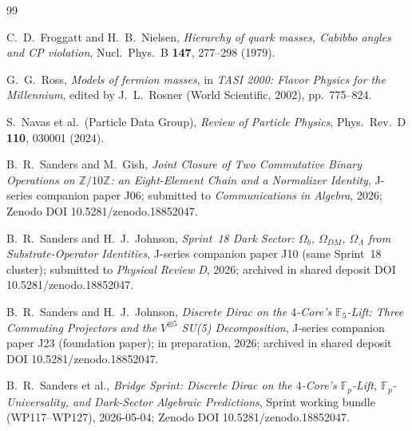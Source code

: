 \documentclass[11pt,reqno]{amsart}
\theoremstyle{plain}
\theoremstyle{definition}
\theoremstyle{remark}
\newcommand{\F}{\mathbb{F}}
\begin{document}
\begin{thebibliography}{99}

C.~D.~Froggatt and H.~B.~Nielsen,
\emph{Hierarchy of quark masses, Cabibbo angles and CP
violation},
Nucl.\ Phys.\ B \textbf{147}, 277--298 (1979).

G.~G.~Ross,
\emph{Models of fermion masses},
in \emph{TASI 2000: Flavor Physics for the Millennium}, edited
by J.~L.~Rosner (World Scientific, 2002), pp.\ 775--824.

S.~Navas et al.\ (Particle Data Group),
\emph{Review of Particle Physics},
Phys.\ Rev.\ D \textbf{110}, 030001 (2024).

B.~R.~Sanders and M.~Gish,
\emph{Joint Closure of Two Commutative Binary Operations on
$\mathbb{Z}/10\mathbb{Z}$: an Eight-Element Chain and a
Normalizer Identity},
J-series companion paper J06; submitted to
\emph{Communications in Algebra}, 2026;
Zenodo DOI 10.5281/zenodo.18852047.

B.~R.~Sanders and H.~J.~Johnson,
\emph{Sprint~18 Dark Sector: $\Omega_{b}$, $\Omega_{DM}$,
$\Omega_{\Lambda}$ from Substrate-Operator Identities},
J-series companion paper J10 (same Sprint~18 cluster);
submitted to \emph{Physical Review D}, 2026;
archived in shared deposit DOI 10.5281/zenodo.18852047.

B.~R.~Sanders and H.~J.~Johnson,
\emph{Discrete Dirac on the $4$-Core's $\F_{5}$-Lift:
Three Commuting Projectors and the $V^{\otimes 5}$ SU(5)
Decomposition},
J-series companion paper J23 (foundation paper);
in preparation, 2026;
archived in shared deposit DOI 10.5281/zenodo.18852047.

B.~R.~Sanders et al.,
\emph{Bridge Sprint: Discrete Dirac on the $4$-Core's
$\F_{p}$-Lift, $\F_{p}$-Universality, and Dark-Sector
Algebraic Predictions},
Sprint working bundle (WP117--WP127), 2026-05-04;
Zenodo DOI 10.5281/zenodo.18852047.

\end{thebibliography}
\end{document}
